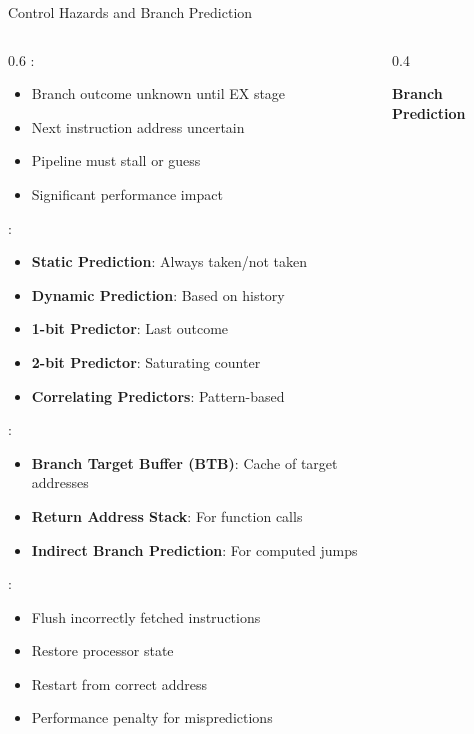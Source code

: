 \begin{frame}{Control Hazards and Branch Prediction}
\begin{columns}
\begin{column}{0.6\textwidth}
:
\begin{itemize}
\item Branch outcome unknown until EX stage
\item Next instruction address uncertain
\item Pipeline must stall or guess
\item Significant performance impact
\end{itemize}

\vspace{0.3cm}
:
\begin{itemize}
\item \textbf{Static Prediction}: Always taken/not taken
\item \textbf{Dynamic Prediction}: Based on history
\item \textbf{1-bit Predictor}: Last outcome
\item \textbf{2-bit Predictor}: Saturating counter
\item \textbf{Correlating Predictors}: Pattern-based
\end{itemize}

\vspace{0.3cm}
:
\begin{itemize}
\item \textbf{Branch Target Buffer (BTB)}: Cache of target addresses
\item \textbf{Return Address Stack}: For function calls
\item \textbf{Indirect Branch Prediction}: For computed jumps
\end{itemize}

\vspace{0.3cm}
:
\begin{itemize}
\item Flush incorrectly fetched instructions
\item Restore processor state
\item Restart from correct address
\item Performance penalty for mispredictions
\end{itemize}
\end{column}
\begin{column}{0.4\textwidth}
\begin{center}
\textbf{Branch Prediction}
\vspace{0.3cm}


\end{center}
\end{column}
\end{columns}
\end{frame}
